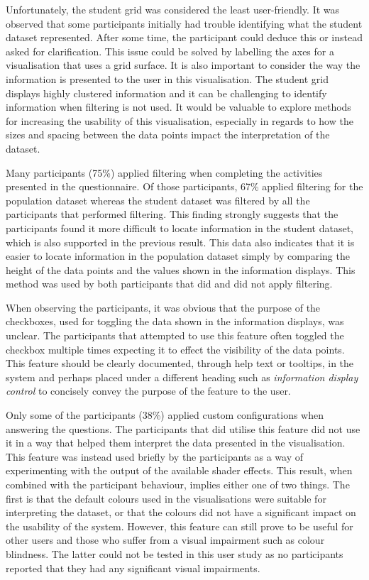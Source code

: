 {{		Unfortunately, the student grid was considered the least user-friendly. It was observed that some participants initially had trouble identifying what the student dataset represented. After some time, the participant could deduce this or instead asked for clarification. This issue could be solved by labelling the axes for a visualisation that uses a grid surface. It is also important to consider the way the information is presented to the user in this visualisation. The student grid displays highly clustered information and it can be challenging to identify information when filtering is not used. It would be valuable to explore methods for increasing the usability of this visualisation, especially in regards to how the sizes and spacing between the data points impact the interpretation of the dataset.

		Many participants (75\%) applied filtering when completing the activities presented in the questionnaire. Of those participants, 67\% applied filtering for the population dataset whereas the student dataset was filtered by all the participants that performed filtering. This finding strongly suggests that the participants found it more difficult to locate information in the student dataset, which is also supported in the previous result. This data also indicates that it is easier to locate information in the population dataset simply by comparing the height of the data points and the values shown in the information displays. This method was used by both participants that did and did not apply filtering.

		When observing the participants, it was obvious that the purpose of the checkboxes, used for toggling the data shown in the information displays, was unclear. The participants that attempted to use this feature often toggled the checkbox multiple times expecting it to effect the visibility of the data points. This feature should be clearly documented, through help text or tooltips, in the system and perhaps placed under a different heading such as \emph{information display control} to concisely convey the purpose of the feature to the user.

		Only some of the participants (38\%) applied custom configurations when answering the questions. The participants that did utilise this feature did not use it in a way that helped them interpret the data presented in the visualisation. This feature was instead used briefly by the participants as a way of experimenting with the output of the available shader effects. This result, when combined with the participant behaviour, implies either one of two things. The first is that the default colours used in the visualisations were suitable for interpreting the dataset, or that the colours did not have a significant impact on the usability of the system. However, this feature can still prove to be useful for other users and those who suffer from a visual impairment such as colour blindness. The latter could not be tested in this user study as no participants reported that they had any significant visual impairments.

}}
